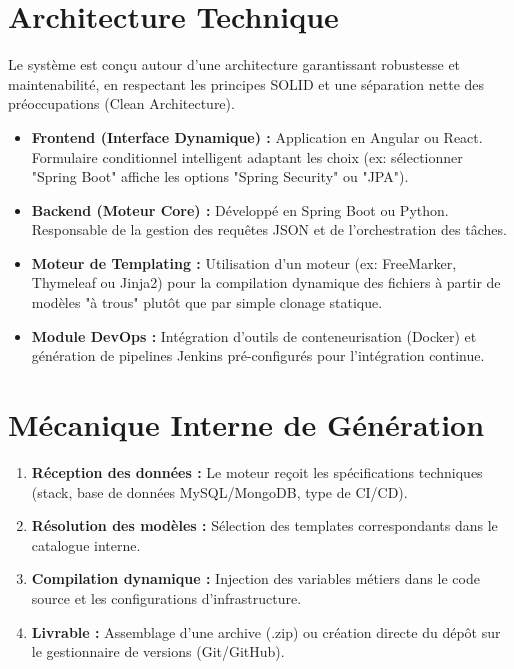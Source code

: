 \documentclass[11pt,a4paper]{article}
\begin{document}
\section{Architecture Technique}
Le système est conçu autour d'une architecture garantissant robustesse et maintenabilité, en respectant les principes SOLID et une séparation nette des préoccupations (Clean Architecture).

\begin{itemize}[label=\textcolor{primary}{\textbullet}]
    \item \textbf{Frontend (Interface Dynamique) :} Application en Angular ou React. Formulaire conditionnel intelligent adaptant les choix (ex: sélectionner "Spring Boot" affiche les options "Spring Security" ou "JPA").
    \item \textbf{Backend (Moteur Core) :} Développé en Spring Boot ou Python. Responsable de la gestion des requêtes JSON et de l'orchestration des tâches.
    \item \textbf{Moteur de Templating :} Utilisation d'un moteur (ex: FreeMarker, Thymeleaf ou Jinja2) pour la compilation dynamique des fichiers à partir de modèles "à trous" plutôt que par simple clonage statique.
    \item \textbf{Module DevOps :} Intégration d'outils de conteneurisation (Docker) et génération de pipelines Jenkins pré-configurés pour l'intégration continue.
\end{itemize}

\section{Mécanique Interne de Génération}
\begin{enumerate}
    \item \textbf{Réception des données :} Le moteur reçoit les spécifications techniques (stack, base de données MySQL/MongoDB, type de CI/CD).
    \item \textbf{Résolution des modèles :} Sélection des templates correspondants dans le catalogue interne.
    \item \textbf{Compilation dynamique :} Injection des variables métiers dans le code source et les configurations d'infrastructure.
    \item \textbf{Livrable :} Assemblage d'une archive (.zip) ou création directe du dépôt sur le gestionnaire de versions (Git/GitHub).
\end{enumerate}
\end{document}
